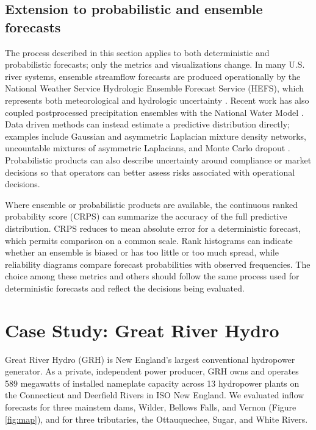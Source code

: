 \documentclass[MLA]{USG} %
\begin{document}
\subsection{Extension to probabilistic and ensemble forecasts}\label{sec:probabilistic}

The process described in this section applies to both deterministic and probabilistic forecasts; only the metrics and visualizations change. In many U.S. river systems, ensemble streamflow forecasts are produced operationally by the National Weather Service Hydrologic Ensemble Forecast Service (HEFS), which represents both meteorological and hydrologic uncertainty \citep{demargneScienceNOAAsOperational2014}. Recent work has also coupled postprocessed precipitation ensembles with the National Water Model \citep{towlerImplementingEvaluatingNational2025}. Data driven methods can instead estimate a predictive distribution directly; examples include Gaussian and asymmetric Laplacian mixture density networks, uncountable mixtures of asymmetric Laplacians, and Monte Carlo dropout \citep{klotzUncertaintyEstimationDeep2022}. Probabilistic products can also describe uncertainty around compliance or market decisions so that operators can better assess risks associated with operational decisions.

Where ensemble or probabilistic products are available, the continuous ranked probability score (CRPS) can summarize the accuracy of the full predictive distribution. CRPS reduces to mean absolute error for a deterministic forecast, which permits comparison on a common scale. Rank histograms can indicate whether an ensemble is biased or has too little or too much spread, while reliability diagrams compare forecast probabilities with observed frequencies. The choice among these metrics and others should follow the same process used for deterministic forecasts and reflect the decisions being evaluated.


\section{Case Study: Great River Hydro}

Great River Hydro (GRH) is New England's largest conventional hydropower generator. As a private, independent power producer, GRH owns and operates 589 megawatts of installed nameplate capacity across 13 hydropower plants on the Connecticut and Deerfield Rivers in ISO New England. We evaluated inflow forecasts for three mainstem dams, Wilder, Bellows Falls, and Vernon (Figure \ref{fig:map}), and for three tributaries, the Ottauquechee, Sugar, and White Rivers.
\end{document}
